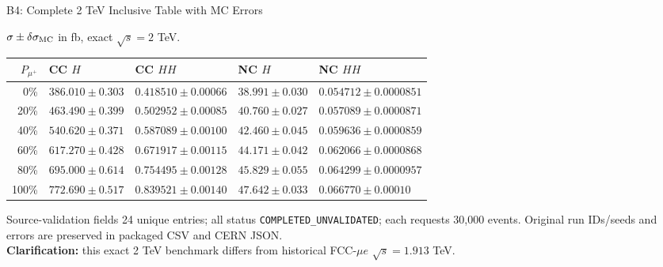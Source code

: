 \documentclass[aspectratio=1610,english]{beamer}
\newcommand{\src}[1]{\vfill{\par\color{black!65}\fontsize{6.4}{7.4}\selectfont\emph{Source:} #1\par}}
\begin{document}
\begin{frame}[t]{B4: Complete 2 TeV Inclusive Table with MC Errors}
\scriptsize

\begin{center}\scriptsize $\sigma\pm\delta\sigma_{\rm MC}$ in fb, exact $\sqrt{s}=2$ TeV.\end{center}
\begin{center}\setlength{\tabcolsep}{3pt}\renewcommand{\arraystretch}{1.23}\begin{tabular}{rllll}\toprule $P_{\mu^+}$ & CC $H$ & CC $HH$ & NC $H$ & NC $HH$ \\ \midrule
0\% & $386.010\pm0.303$ & $0.418510\pm0.00066$ & $38.991\pm0.030$ & $0.054712\pm0.0000851$ \\
20\% & $463.490\pm0.399$ & $0.502952\pm0.00085$ & $40.760\pm0.027$ & $0.057089\pm0.0000871$ \\
40\% & $540.620\pm0.371$ & $0.587089\pm0.00100$ & $42.460\pm0.045$ & $0.059636\pm0.0000859$ \\
60\% & $617.270\pm0.428$ & $0.671917\pm0.00115$ & $44.171\pm0.042$ & $0.062066\pm0.0000868$ \\
80\% & $695.000\pm0.614$ & $0.754495\pm0.00128$ & $45.829\pm0.055$ & $0.064299\pm0.0000957$ \\
100\% & $772.690\pm0.517$ & $0.839521\pm0.00140$ & $47.642\pm0.033$ & $0.066770\pm0.00010$ \\
\bottomrule\end{tabular}
\end{center}
\vspace{-.4em}\begin{block}{Source-validation fields}
\justifying	\scriptsize
24 unique entries; all status \texttt{COMPLETED\_UNVALIDATED}; each requests 30,000 events. Original run IDs/seeds and errors are preserved in packaged CSV and CERN JSON.\\[.15em]
\textbf{Clarification:} this exact 2 TeV benchmark differs from historical FCC-$\mu e$ $\sqrt{s}=1.913$ TeV.
\end{block}

\end{frame}
\end{document}
